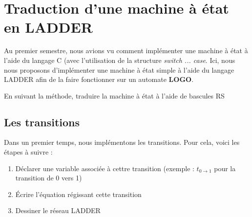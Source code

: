 \section{Traduction d'une machine à état en LADDER}
Au premier semestre, nous avions vu comment implémenter une machine à état à l'aide du langage C (avec l'utilisation de la structure \textit{switch ... case}. Ici, nous nous proposons d'implémenter une machine à état simple à l'aide du langage LADDER afin de la faire fonctionner sur un automate \textbf{LOGO}.




\begin{UPSTIactivite}
	En suivant la méthode, traduire la machine à état à l'aide de bascules RS
	\vspace{15cm}
\end{UPSTIactivite}

\subsection{Les transitions}
Dans un premier temps, nous implémentons les transitions. Pour cela, voici les étapes à suivre :
\begin{enumerate}[label=(\alph*)]
	\item Déclarer une variable associée à cettre transition (exemple : $t_{0\rightarrow1}$ pour la transition de 0 vers 1)
	\item Écrire l'équation régissant cette transition
	\item Dessiner le réseau LADDER
\end{enumerate}


